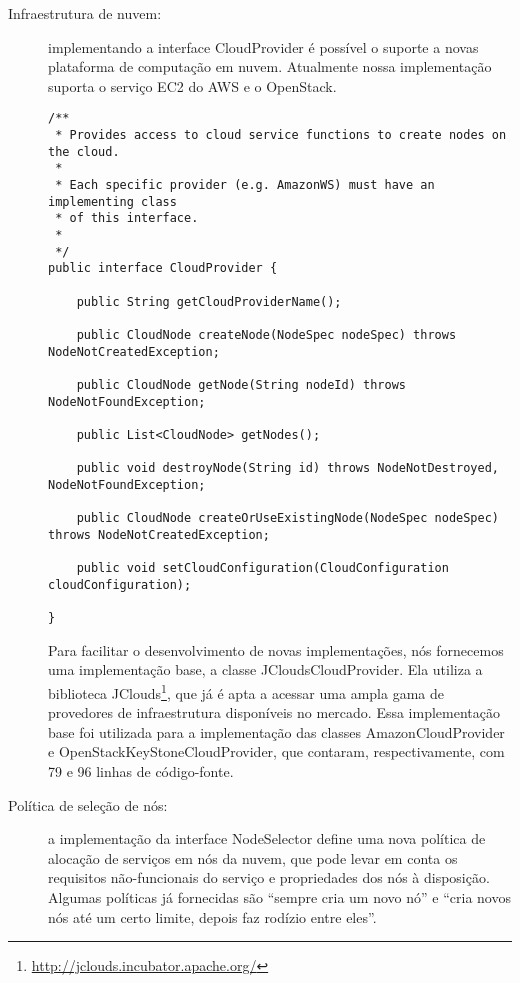 \begin{description}

\item [Infraestrutura de nuvem:] implementando a interface \textsf{CloudProvider} é possível o suporte a novas plataforma de computação em nuvem. Atualmente nossa implementação suporta o serviço EC2 do AWS e o OpenStack.

\begin{lstlisting}[frame=trbl, label=lst:cloud_provider, caption=Interface CloudProvider.]
/**
 * Provides access to cloud service functions to create nodes on the cloud.
 * 
 * Each specific provider (e.g. AmazonWS) must have an implementing class 
 * of this interface.
 * 
 */
public interface CloudProvider {

    public String getCloudProviderName();

    public CloudNode createNode(NodeSpec nodeSpec) throws NodeNotCreatedException;

    public CloudNode getNode(String nodeId) throws NodeNotFoundException;

    public List<CloudNode> getNodes();

    public void destroyNode(String id) throws NodeNotDestroyed, NodeNotFoundException;

    public CloudNode createOrUseExistingNode(NodeSpec nodeSpec) throws NodeNotCreatedException;

    public void setCloudConfiguration(CloudConfiguration cloudConfiguration);

}
\end{lstlisting}


Para facilitar o desenvolvimento de novas implementações,
nós fornecemos uma implementação base, a classe \textsf{JCloudsCloudProvider}.
Ela utiliza a biblioteca JClouds\footnote{\url{http://jclouds.incubator.apache.org/}},
que já é apta a acessar uma ampla gama de provedores de infraestrutura disponíveis no mercado.
Essa implementação base foi utilizada para a implementação das classes 
\textsf{AmazonCloudProvider} e \textsf{OpenStackKeyStoneCloudProvider},
que contaram, respectivamente, com 79 e 96 linhas de código-fonte.


\item [Política de seleção de nós:] a implementação da interface \textsf{NodeSelector} define uma nova política de alocação de serviços em nós da nuvem, que pode levar em conta os requisitos não-funcionais do serviço e propriedades dos nós à disposição.
Algumas políticas já fornecidas são ``sempre cria um novo nó'' e 
``cria novos nós até um certo limite, depois faz rodízio entre eles''.


\end{description}
